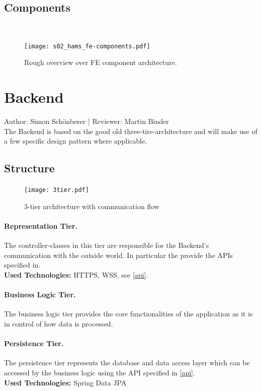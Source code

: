 \documentclass{scrreprt}
\begin{document}
\subsection{Components}
~
\begin{figure}[!h]
	\centering
	\texttt{[image: s02\_hams\_fe-components.pdf]}
	\caption{Rough overview over FE component architecture.}
	\label{fecomp}
\end{figure}

\section{Backend}
Author: Simon Sch\"onberer | Reviewer: Martin Binder\\ 

The Backend is based on the good old three-tire-architecture and will make use of a few specific
design pattern where applicable.

\subsection{Structure}
\begin{figure}[h]
	\centering
	\texttt{[image: 3tier.pdf]}
	\caption{3-tier architecture with communication flow}
	\label{3tier}
\end{figure}
\paragraph{Representation Tier.} The controller-classes in this tier are responsible for the Backend's communication with the outside world. In particular the provide the APIs specified in. \\
\textbf{Used Technologies:} HTTPS, WSS, see \ref{api}.

\paragraph{Business Logic Tier.} The business logic tier provides the core functionalities of the application as it is in control of how data is processed. 

\paragraph{Persistence Tier.} The persistence tier represents the database and data access layer which can be accessed by the business logic using the API specified in \ref{api}. \\
\textbf{Used Technologies:} Spring Data JPA
\end{document}
